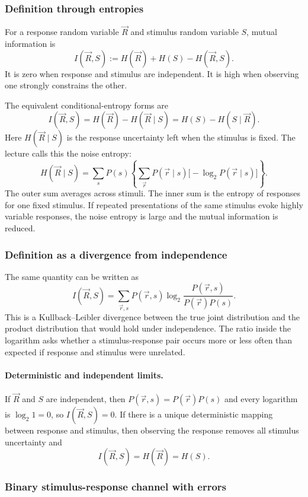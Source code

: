 \subsubsection{Definition through entropies}

For a response random variable $\vec{R}$ and stimulus random variable $S$, mutual information is
\[
    I(\vec{R},S)
    :=
    H(\vec{R})+H(S)-H(\vec{R},S).
\]
It is zero when response and stimulus are independent. It is high when observing one strongly constrains the other.

The equivalent conditional-entropy forms are
\[
    I(\vec{R},S)
    =
    H(\vec{R})-H(\vec{R}\mid S)
    =
    H(S)-H(S\mid \vec{R}).
\]
Here $H(\vec{R}\mid S)$ is the response uncertainty left when the stimulus is fixed. The lecture calls this the noise entropy:
\[
    H(\vec{R}\mid S)
    =
    \sum_s P(s)
    \left\{
    \sum_{\vec{r}}P(\vec{r}\mid s)
    \bigl[-\log_2 P(\vec{r}\mid s)\bigr]
    \right\}.
\]
The outer sum averages across stimuli. The inner sum is the entropy of responses for one fixed stimulus. If repeated presentations of the same stimulus evoke highly variable responses, the noise entropy is large and the mutual information is reduced.

\subsubsection{Definition as a divergence from independence}

The same quantity can be written as
\[
    I(\vec{R},S)
    =
    \sum_{\vec{r},s}
    P(\vec{r},s)
    \log_2
    \frac{P(\vec{r},s)}{P(\vec{r})P(s)}.
\]
This is a Kullback--Leibler divergence between the true joint distribution and the product distribution that would hold under independence. The ratio inside the logarithm asks whether a stimulus-response pair occurs more or less often than expected if response and stimulus were unrelated.

\paragraph{Deterministic and independent limits.}
If $\vec{R}$ and $S$ are independent, then $P(\vec{r},s)=P(\vec{r})P(s)$ and every logarithm is $\log_2 1=0$, so $I(\vec{R},S)=0$. If there is a unique deterministic mapping between response and stimulus, then observing the response removes all stimulus uncertainty and
\[
    I(\vec{R},S)=H(\vec{R})=H(S).
\]

\subsubsection{Binary stimulus-response channel with errors}


